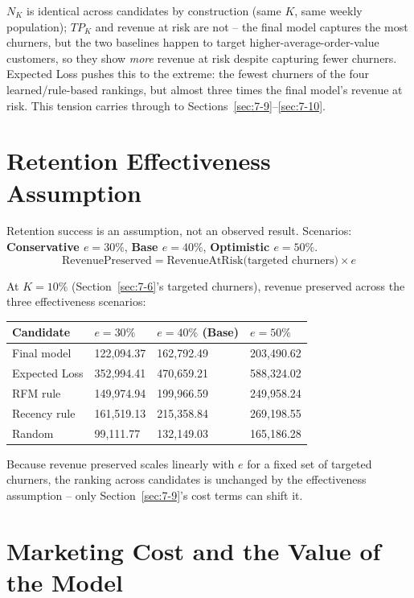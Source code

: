 $N_K$ is identical across candidates by construction (same $K$, same weekly population); $TP_K$ and revenue at risk are not -- the final model captures the most churners, but the two baselines happen to target higher-average-order-value customers, so they show \emph{more} revenue at risk despite capturing fewer churners. Expected Loss pushes this to the extreme: the fewest churners of the four learned/rule-based rankings, but almost three times the final model's revenue at risk. This tension carries through to Sections~\ref{sec:7-9}--\ref{sec:7-10}.

\section{Retention Effectiveness Assumption}
\label{sec:7-7}

Retention success is an assumption, not an observed result. Scenarios: \textbf{Conservative $e = 30\%$}, \textbf{Base $e = 40\%$}, \textbf{Optimistic $e = 50\%$}.
\begin{equation*}
    \text{RevenuePreserved} = \text{RevenueAtRisk(targeted churners)} \times e
\end{equation*}

At $K=10\%$ (Section~\ref{sec:7-6}'s targeted churners), revenue preserved across the three effectiveness scenarios:

\begin{center}
\begin{tabular}{@{}p{2.8cm}p{2.6cm}p{2.6cm}p{2.6cm}@{}}
    \toprule
    Candidate & $e=30\%$ & $e=40\%$ (Base) & $e=50\%$ \\
    \midrule
    Final model & 122,094.37 & 162,792.49 & 203,490.62 \\
    Expected Loss & 352,994.41 & 470,659.21 & 588,324.02 \\
    RFM rule & 149,974.94 & 199,966.59 & 249,958.24 \\
    Recency rule & 161,519.13 & 215,358.84 & 269,198.55 \\
    Random & 99,111.77 & 132,149.03 & 165,186.28 \\
    \bottomrule
\end{tabular}
\end{center}

Because revenue preserved scales linearly with $e$ for a fixed set of targeted churners, the ranking across candidates is unchanged by the effectiveness assumption -- only Section~\ref{sec:7-9}'s cost terms can shift it.

\section{Marketing Cost and the Value of the Model}
\label{sec:7-8}


